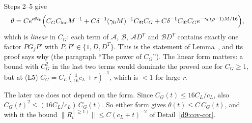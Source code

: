 \begin{detail}
\begin{step}[Counting]
\end{step}
\begin{step}
Steps 2--5 give
\[
\theta=Ce^{\kappa\mathsf N_{\rm b}}\Big(C_GC_{\rm loc}M^{-1}+C\delta^{-1}(\gamma_0M)^{-1}C_{\mathfrak N}C_G+C\delta^{-1}C_{\mathfrak N}C_Ge^{-\gamma_0(\rho-1)M/16}\Big),
\]
which is \emph{linear} in $C_G$: each term of $\mathcal A$, $\mathcal B$, $\mathcal AD^T$ and $\mathcal BD^T$ contains exactly one factor $PG_jP'$ with $P,P'\in\{1,D,D^T\}$. This is the statement of Lemma~, and its proof says why (the paragraph ``The power of $C_G$''). The linear form matters: a bound with $C_G^2$ in the last two terms would dominate the proved one for $C_G\ge1$, but at (L5) $C_G=C_L(\frac1{16}c_L+r)^{-1}$, which is $<1$ for large $r$.

The later use does not depend on the form. Since $C_G(t)\le16C_L/c_L$, also $C_G(t)^2\le(16C_L/c_L)\,C_G(t)$. So either form gives $\theta(t)\le C\,C_G(t)$, and with it the bound $\|R^{(\ge1)}_t\|\le C(c_L+t)^{-2}$ of Detail~\ref{d9:cov-cor}.
\end{step}
\end{detail}

